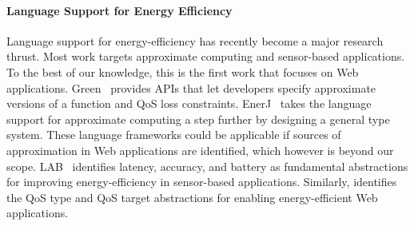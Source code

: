 \paragraph{Language Support for Energy Efficiency} Language support for energy-efficiency has recently become a major research thrust. Most work targets approximate computing and sensor-based applications. To the best of our knowledge, this is the first work that focuses on Web applications. Green~\cite{green} provides APIs that let developers specify approximate versions of a function and QoS loss constraints. EnerJ~\cite{enerJ} takes the language support for approximate computing a step further by designing a general type system. These language frameworks could be applicable if sources of approximation in Web applications are identified, which however is beyond our scope. LAB~\cite{lab} identifies latency, accuracy, and battery as fundamental abstractions for improving energy-efficiency in sensor-based applications. Similarly, \greenweb identifies the QoS type and QoS target abstractions for enabling energy-efficient Web applications.


%
%

